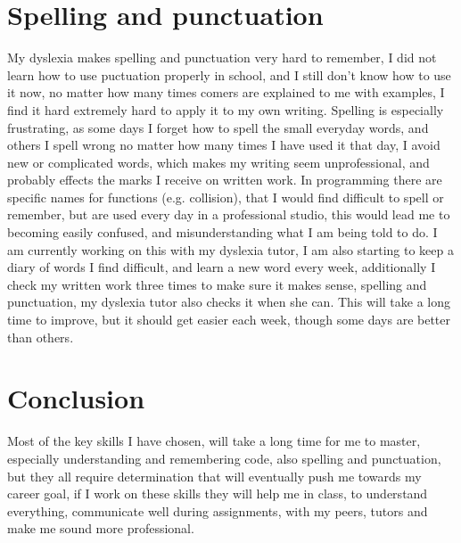 \documentclass{scrartcl}
\begin{document}
\section{Spelling and punctuation}

My dyslexia makes spelling and punctuation very hard to remember, I did not learn how to use puctuation properly in school, and I still don't know how to use it now, no matter how many times comers are explained to me with examples, I find it hard extremely hard to apply it to my own writing. Spelling is especially frustrating, as some days I forget how to spell the small everyday words, and others I spell wrong no matter how many times I have used it that day, I avoid new or complicated words, which makes my writing seem unprofessional, and probably effects the marks I receive on written work. In programming there are specific names for functions (e.g. collision), that I would find difficult to spell or remember, but are used every day in a professional studio, this would lead me to becoming easily confused, and misunderstanding what I am being told to do. I am currently working on this with my dyslexia tutor, I am also starting to keep a diary of words I find difficult, and learn a new word every week, additionally I check my written work three times to make sure it makes sense, spelling and punctuation, my dyslexia tutor also checks it when she can. This will take a long time to improve, but it should get easier each week, though some days are better than others.

\section{Conclusion}

Most of the key skills I have chosen, will take a long time for me to master, especially understanding and remembering code, also spelling and punctuation, but they all require determination that will eventually push me towards my career goal, if I work on these skills they will help me in class, to understand everything, communicate well during assignments, with my peers, tutors and make me sound more professional.
\end{document}

